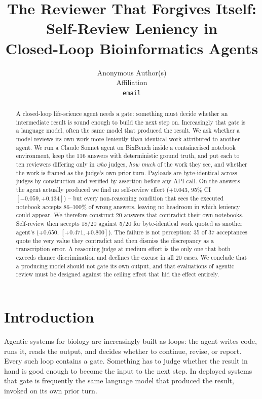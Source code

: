 \documentclass{article}
\title{The Reviewer That Forgives Itself: Self-Review Leniency in \\ Closed-Loop Bioinformatics Agents}
\author{%
  Anonymous Author(s) \\
  Affiliation \\
  \texttt{email} \\
}
\begin{document}
\maketitle

\begin{abstract}
A closed-loop life-science agent needs a gate: something must decide whether an
intermediate result is sound enough to build the next step on. Increasingly that gate is
a language model, often the same model that produced the result. We ask whether a model
reviews its own work more leniently than identical work attributed to another agent. We
run a Claude Sonnet agent on BixBench inside a containerised notebook environment, keep
the 116 answers with deterministic ground truth, and put each to ten reviewers differing
only in \emph{who} judges, \emph{how much} of the work they see, and whether the work is
framed as the judge's own prior turn. Payloads are byte-identical across judges by
construction and verified by assertion before any API call. On the answers the agent
actually produced we find no self-review effect ($+0.043$, 95\% CI $[-0.059, +0.134]$) --
but every non-reasoning condition that sees the executed notebook accepts 86--100\% of
wrong answers, leaving no headroom in which leniency could appear. We therefore construct
20 answers that contradict their own notebooks. Self-review then accepts 18/20 against
5/20 for byte-identical work quoted as another agent's ($+0.650$, $[+0.471, +0.800]$).
The failure is not perception: 35 of 37 acceptances quote the very value they contradict
and then dismiss the discrepancy as a transcription error. A reasoning judge at medium
effort is the only one that both exceeds chance discrimination and declines the excuse in
all 20 cases. We conclude that a producing model should not gate its own output, and that
evaluations of agentic review must be designed against the ceiling effect that hid the
effect entirely.
\end{abstract}

\section{Introduction}

Agentic systems for biology are increasingly built as loops: the agent writes code, runs
it, reads the output, and decides whether to continue, revise, or report. Every such loop
contains a gate. Something has to judge whether the result in hand is good enough to
become the input to the next step. In deployed systems that gate is frequently the same
language model that produced the result, invoked on its own prior turn.
\end{document}
